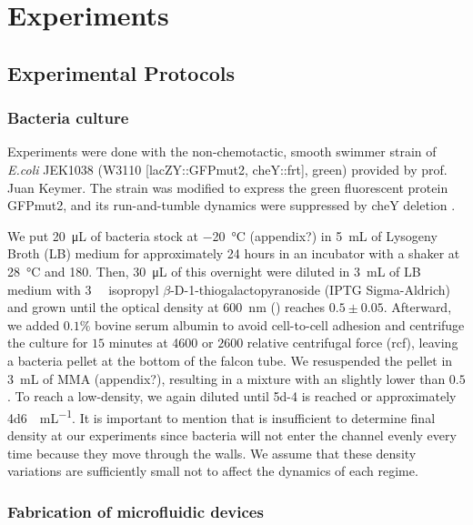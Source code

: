 \chapter{Experiments}

\section{Experimental Protocols}
\subsection{Bacteria culture}

Experiments were done with the non-chemotactic, smooth swimmer strain of \textit{E.coli} JEK1038 (W3110 [lacZY::GFPmut2, cheY::frt], green) provided by prof. Juan Keymer. The strain was modified to express the green fluorescent protein GFPmut2, and its run-and-tumble dynamics were suppressed by cheY deletion \cite{VanVliet2014ThePopulations}. 

We put \SI{20}{\micro\liter} of bacteria stock at \SI{-20}{\degreeCelsius} (appendix?) in \SI{5}{\milli\liter} of Lysogeny Broth (LB) medium for approximately 24 hours in an incubator with a shaker at \SI{28}{\degreeCelsius} and \SI{180}{\rpm}. Then, \SI{30}{\micro\liter} of this overnight were diluted in \SI{3}{\milli\liter} of LB medium with \SI{3}{\milli\molar} isopropyl $\beta$-D-1-thiogalactopyranoside (IPTG Sigma-Aldrich) and grown until the optical density at \SI{600}{\nano\meter} (\SI{}{\OD}) reaches $0.5\pm0.05$. Afterward, we added $0.1\%$ bovine serum albumin to avoid cell-to-cell adhesion and centrifuge the culture for $15$ minutes at \SI{4600}{\rpm} or $2600$ relative centrifugal force (rcf), leaving a bacteria pellet at the bottom of the falcon tube. We resuspended the pellet in \SI{3}{\milli\liter} of MMA (appendix?), resulting in a mixture with an \SI{}{\OD} slightly lower than $0.5$. To reach a low-density, we again diluted until \SI{5d-4}{\OD} is reached or approximately \SI[per-mode = symbol]{4d6}{\cells\per\milli\liter}. It is important to mention that \SI{}{\OD} is insufficient to determine final density at our experiments since bacteria will not enter the channel evenly every time because they move through the walls. We assume that these density variations are sufficiently small not to affect the dynamics of each regime.

\subsection{Fabrication of microfluidic devices}


